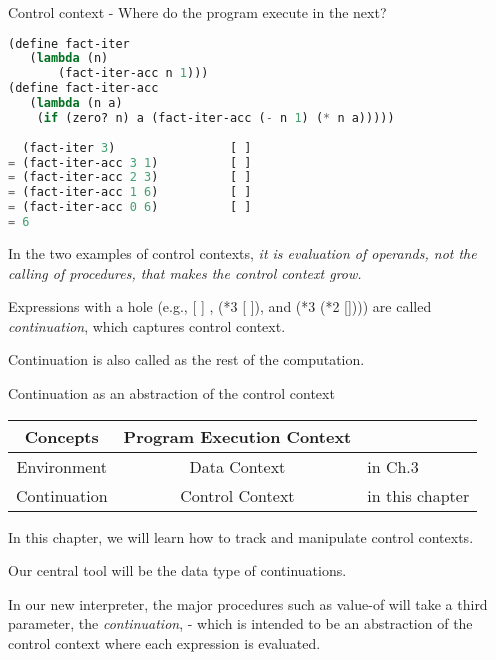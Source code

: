 \documentclass{article}
\begin{document}
\begin{huge}

Control context \al
- Where do the program execute in the next? 
\begin{lstlisting}[language=Lisp]
(define fact-iter 
   (lambda (n) 
       (fact-iter-acc n 1)))
(define fact-iter-acc
   (lambda (n a)
    (if (zero? n) a (fact-iter-acc (- n 1) (* n a)))))
        
  (fact-iter 3)                [ ]
= (fact-iter-acc 3 1)          [ ]  
= (fact-iter-acc 2 3)          [ ]
= (fact-iter-acc 1 6)          [ ] 
= (fact-iter-acc 0 6)          [ ]
= 6
\end{lstlisting}


In the two examples of control contexts,
{\it it is evaluation of operands, not the calling of procedures, that makes the control context grow.}

Expressions with a hole (e.g., [ ] , (*3 [ ]), and (*3 (*2 []))) are 
called {\it continuation}, which captures control context. 

Continuation is also called as the rest of the computation.


Continuation as an abstraction of the control context \al
\ \al
\begin{tabular}{| c | c | l |} \hline
Concepts & Program Execution Context &  \\ \hline \hline
Environment & Data Context & in Ch.3 \\ \hline
Continuation & Control Context & in this chapter \\ \hline
\end{tabular}

In this chapter, we will learn how to track and manipulate control contexts.

Our central tool will be the data type of continuations.
   

In our new interpreter, the major procedures such as value-of will take a third parameter, the {\it continuation}, \al
- which is intended to be an abstraction of the control context where each expression is evaluated.


\end{huge}
\end{document}
